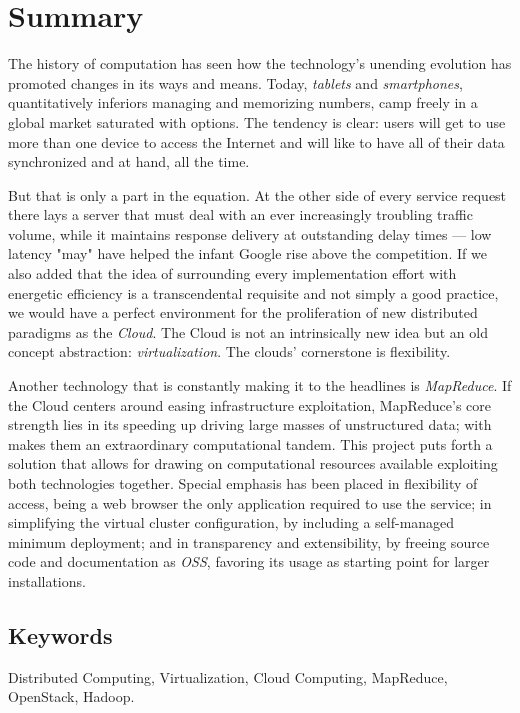 \chapter*{Summary}

\noindent The history of computation has seen how the technology's unending evolution has promoted changes in its ways and means. Today, \textit{tablets} and \textit{smartphones}, quantitatively inferiors managing and memorizing numbers, camp freely in a global market saturated with options. The tendency is clear: users will get to use more than one device to access the Internet and will like to have all of their data synchronized and at hand, all the time.

But that is only a part in the equation. At the other side of every service request there lays a server that must deal with an ever increasingly troubling traffic volume, while it maintains response delivery at outstanding delay times --- low latency "may" have helped the infant Google rise above the competition. If we also added that the idea of surrounding every implementation effort with energetic efficiency is a transcendental requisite and not simply a good practice, we would have a perfect environment for the proliferation of new distributed paradigms as the \emph{Cloud}. The Cloud is not an intrinsically new idea but an old concept abstraction: \emph{virtualization}. The clouds' cornerstone is flexibility.

Another technology that is constantly making it to the headlines is \emph{MapReduce}. If the Cloud centers around easing infrastructure exploitation, MapReduce's core strength lies in its speeding up driving large masses of unstructured data; with makes them an extraordinary computational tandem. This project puts forth a solution that allows for drawing on computational resources available exploiting both technologies together. Special emphasis has been placed in flexibility of access, being a web browser the only application required to use the service; in simplifying the virtual cluster configuration, by including a self-managed minimum deployment; and in transparency and extensibility, by freeing source code and documentation as \emph{OSS}, favoring its usage as starting point for larger installations.


\section*{Keywords}
\noindent Distributed Computing, Virtualization, Cloud Computing, MapReduce, OpenStack, Hadoop.
